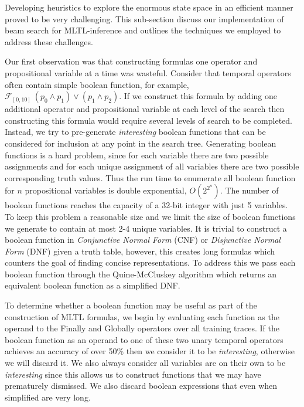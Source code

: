 \documentclass[runningheads]{llncs}
\begin{document}
Developing heuristics to explore the enormous state space in an efficient manner proved to be very challenging. This sub-section discuss our implementation of beam search for MLTL-inference and outlines the techniques we employed to address these challenges.

Our first observation was that constructing formulas one operator and propositional variable at a time was wasteful. Consider that temporal operators often contain simple boolean function, for example, $\mathcal{F}_{[0,10]}\ (p_0 \land p_1 ) \lor (p_1 \land p_2 )$. If we construct this formula by adding one additional operator and propositional variable at each level of the search then constructing this formula would require several levels of search to be completed. Instead, we try to pre-generate \textit{interesting} boolean functions that can be considered for inclusion at any point in the search tree. Generating boolean functions is a hard problem, since for each variable there are two possible assignments and for each unique assignment of all variables there are two possible corresponding truth values. Thus the run time to enumerate all boolean function for $n$ propositional variables is double exponential, $O(2^{2^n})$. The number of boolean functions reaches the capacity of a 32-bit integer with just 5 variables. To keep this problem a reasonable size and we limit the size of boolean functions we generate to contain at most 2-4 unique variables. It is trivial to construct a boolean function in \textit{Conjunctive Normal Form} (CNF) or \textit{Disjunctive Normal Form} (DNF) given a truth table, however, this creates long formulas which counters the goal of finding concise representations. To address this we pass each boolean function through the Quine-McCluskey algorithm\cite{quine1952,quine1955,mccluskey1956} which returns an equivalent boolean function as a simplified DNF.

To determine whether a boolean function may be useful as part of the construction of MLTL formulas, we begin by evaluating each function as the operand to the Finally and Globally operators over all training traces. If the boolean function as an operand to one of these two unary temporal operators achieves an accuracy of over 50\% then we consider it to be \textit{interesting}, otherwise we will discard it. We also always consider all variables are on their own to be \textit{interesting} since this allows us to construct functions that we may have prematurely dismissed. We also discard boolean expressions that even when simplified are very long. 
\end{document}
